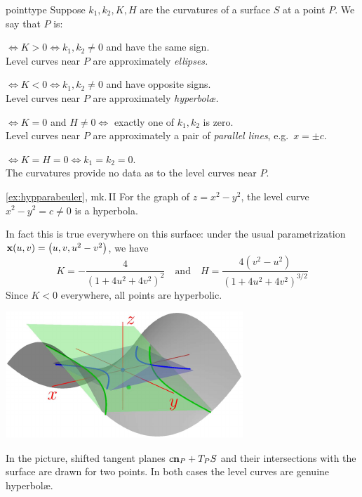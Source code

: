\begin{defn}{}{pointtype}
Suppose $k_1,k_2,K,H$ are the curvatures of a surface $S$ at a point $P$. We say that $P$ is:
\begin{description}\itemsep0pt
	\item[\normalfont\emph{Elliptic}]\negthickspace$\iff K>0\iff k_1,k_2\neq 0$ and have the same sign.\\
  Level curves near $P$ are approximately \emph{ellipses.}
  \item[\normalfont\emph{Hyperbolic}]\negthickspace$\iff K<0\iff k_1,k_2\neq 0$ and have opposite signs.\\
  Level curves near $P$ are approximately \emph{hyperbolæ.}
  \item[\normalfont\emph{Parabolic}]\negthickspace$\iff K=0$ and $H\neq 0 \iff$ exactly one of $k_1,k_2$ is zero.\\
  Level curves near $P$ are approximately a pair of \emph{parallel lines}, e.g.\ $x=\pm c$.
  \item[\normalfont\emph{Planar}]\negthickspace$\iff K=H=0\iff k_1=k_2=0$.\\
  The curvatures provide no data as to the level curves near $P$.
\end{description}
\end{defn}


\begin{example*}{\ref{ex:hypparabeuler}, mk.\,II}{}
For the graph of $z=x^2-y^2$, the level curve $x^2-y^2=c\neq 0$ is a hyperbola.\par
\begin{minipage}[t]{0.63\linewidth}\vspace{-5pt}
In fact this is true everywhere on this surface: under the usual parametrization ${\mathbf{x}}(u,v)=\bigl(u,v,u^2-v^2\bigr)$, we have
\[K=-\frac{4}{(1+4u^2+4v^2)^2}\quad\text{and}\quad  H=\frac{4(v^2-u^2)}{(1+4u^2+4v^2)^{3/2}}\]
Since $K<0$ everywhere, all points are hyperbolic.
\end{minipage}\hfill\begin{minipage}[t]{0.36\linewidth}\vspace{0pt}
\flushright\href{http://www.math.uci.edu/~ndonalds/math162a/euler-setup3.html}{\includegraphics{euler-setup3}}
\end{minipage}\smallbreak
In the picture, shifted tangent planes $c{\mathbf{n}}_P+T_PS$ and their intersections with the surface are drawn for two points. In both cases the level curves are genuine hyperbolæ.
\end{example*}



